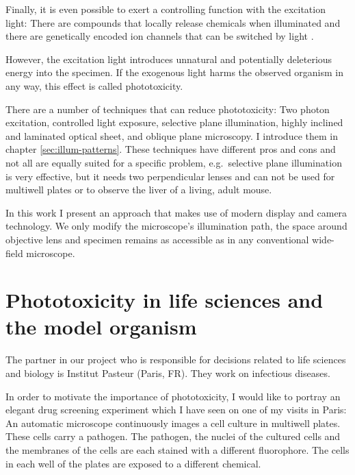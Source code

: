 Finally, it is even possible to exert a controlling function with the
excitation light: There are compounds that locally release chemicals
when illuminated and there are  genetically encoded ion channels that can be
switched by light \citep{Boyden2005}.

However, the excitation light introduces unnatural and potentially
deleterious energy into the specimen. If the exogenous light harms the
observed organism in any way, this effect is called phototoxicity.


There are a number of techniques that can reduce phototoxicity: Two
photon excitation, controlled light exposure, selective plane
illumination, highly inclined and laminated optical sheet, and oblique
plane microscopy. I introduce them in
chapter \ref{sec:illum-patterns}. These techniques have different
pros and cons and not all are equally suited for a specific problem,
e.g.\ selective plane illumination is very effective, but it needs two
perpendicular lenses and can not be used for multiwell plates or to
observe the liver of a living, adult mouse.

In this work I present an approach that makes use of modern display
and camera technology. We only modify the microscope's illumination
path, the space around objective lens and specimen remains as
accessible as in any conventional wide-field microscope.



\section{Phototoxicity in life sciences and the model organism
  \celegans}
\label{sec:intro-phototoxicity}
The partner in our project who is responsible for decisions related to
life sciences and biology is Institut Pasteur (Paris, FR). They work
on infectious diseases. 

In order to motivate the importance of phototoxicity, I would like to
portray an elegant drug screening experiment which I have seen on one
of my visits in Paris: An automatic microscope continuously images a
cell culture in multiwell plates. These cells carry a pathogen. The
pathogen, the nuclei of the cultured cells and the membranes of the
cells are each stained with a different fluorophore. The cells in each
well of the plates are exposed to a different chemical.

